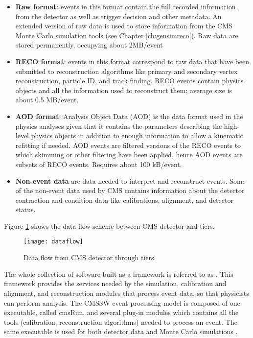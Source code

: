 \begin{itemize}
\item \textbf{Raw format}: events in this format contain the full recorded information from the detector as well as trigger decision and other metadata. An extended version of raw data is used to store information from the CMS Monte Carlo simulation tools (see Chapter \ref{ch:gensimreco}). Raw data are stored permanently, occupying about 2MB/event   
\item \textbf{RECO format}: events in this format correspond to raw data that have been submitted to reconstruction algorithms like primary and secondary vertex reconstruction, particle ID, and track finding. RECO events contain physics objects and all the information used to reconstruct them; average size is about 0.5 MB/event.     
\item \textbf{AOD format}: Analysis Object Data (AOD) is the data format used in the physics analyses given that it contains the parameters describing the high-level physics objects in addition to enough information to allow a kinematic refitting if needed. AOD events are filtered versions of the RECO events to which skimming or other filtering have been applied, hence AOD events are subsets of RECO events. Requires about 100 kB/event.
\item \textbf{Non-event data} are data needed to interpret and reconstruct events. Some of the non-event data used by CMS contains information about the detector contraction and condition data like calibrations, alignment, and detector status.  
\end{itemize}

\noindent Figure \ref{fig:dataflow} shows the data flow scheme between CMS detector and tiers.

\begin{figure}[h!]
  \centering
  \texttt{[image: dataflow]}
  \caption[Data flow from CMS detector through hardware Tiers]{Data flow from CMS detector through tiers.}
  \label{fig:dataflow}
\end{figure}


\noindent  The whole collection of software built as a framework is referred to as . This framework provides the services needed by the simulation, calibration and alignment, and reconstruction modules that process event data, so that physicists can perform analysis. The CMSSW event processing model is composed of one executable, called cmsRun, and several plug-in modules which contains all the tools  (calibration, reconstruction algorithms) needed to process an event. The same executable is used for both detector data and Monte Carlo simulations \cite{cmssw}.
